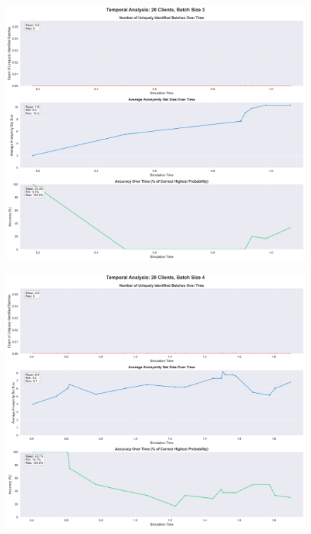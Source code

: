 \documentclass[twocolumn]{article}
\begin{document}
\begin{figure}[!htb]
\centering
\includegraphics[width=\textwidth]{diagrams/temporal_analysis_20_3.png}
\label{fig:temporal_analysis_20_3}
\end{figure}

\begin{figure}[!htb]
\centering
\includegraphics[width=\textwidth]{diagrams/temporal_analysis_20_4.png}
\label{fig:temporal_analysis_20_4}
\end{figure}
\end{document}
